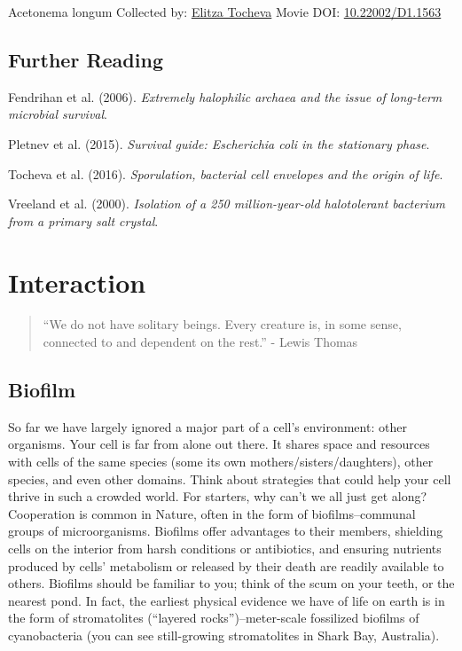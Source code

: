 \documentclass[]{tufte-book}
\begin{document}
\hypertarget{htmlwidget-1e3dd258594b84db62d4}{}

\label{fig:8-11}Acetonema longum Collected by: \protect\hyperlink{elitza_tocheva}{Elitza Tocheva} Movie DOI: \href{https://doi.org/10.22002/D1.1563}{10.22002/D1.1563}

\hypertarget{further-reading-7}{%
\section{Further Reading}\label{further-reading-7}}

Fendrihan et al. (2006). \emph{Extremely halophilic archaea and the issue of long-term microbial survival}.\citep{fendrihan2006}

Pletnev et al. (2015). \emph{Survival guide: Escherichia coli in the stationary phase}.\citep{pletnev2015}

Tocheva et al. (2016). \emph{Sporulation, bacterial cell envelopes and the origin of life}.\citep{tocheva2016}

Vreeland et al. (2000). \emph{Isolation of a 250 million-year-old halotolerant bacterium from a primary salt crystal}.\citep{vreeland2000}

\hypertarget{interaction}{%
\chapter{Interaction}\label{interaction}}

\begin{quote}
``We do not have solitary beings. Every creature is, in some sense, connected to and dependent on the rest.''
- Lewis Thomas \citep{thomas1974}
\end{quote}

\hypertarget{biofilm}{%
\section{Biofilm}\label{biofilm}}

So far we have largely ignored a major part of a cell's environment: other organisms. Your cell is far from alone out there. It shares space and resources with cells of the same species (some its own mothers/sisters/daughters), other species, and even other domains. Think about strategies that could help your cell thrive in such a crowded world. For starters, why can't we all just get along? Cooperation is common in Nature, often in the form of biofilms--communal groups of microorganisms. Biofilms offer advantages to their members, shielding cells on the interior from harsh conditions or antibiotics, and ensuring nutrients produced by cells' metabolism or released by their death are readily available to others. Biofilms should be familiar to you; think of the scum on your teeth, or the nearest pond. In fact, the earliest physical evidence we have of life on earth is in the form of stromatolites (``layered rocks'')--meter-scale fossilized biofilms of cyanobacteria (you can see still-growing stromatolites in Shark Bay, Australia).
\end{document}
